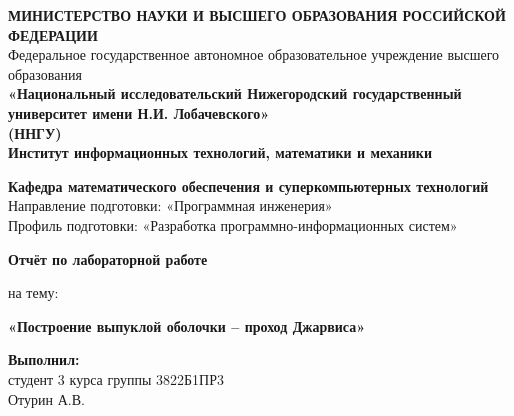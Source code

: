 \documentclass[12pt,a4paper]{extarticle}
\begin{document}
  
  \begin{titlepage}
    \begin{center}
      
      \onehalfspacing
      
      \begin{center}
        \textbf{МИНИСТЕРСТВО НАУКИ И ВЫСШЕГО ОБРАЗОВАНИЯ РОССИЙСКОЙ ФЕДЕРАЦИИ} \\          
        \vspace{0.5cm}
        Федеральное государственное автономное образовательное учреждение высшего образования \\ 
        \vspace{0.5cm}
        \textbf{«Национальный исследовательский Нижегородский государственный университет имени Н.И. Лобачевского»} \\
                \textbf{(ННГУ)} \\
        \vspace{0.5cm}
        \textbf{Институт информационных технологий, математики и механики} \\
        \vspace{0.5cm}
        
        \textbf{Кафедра математического обеспечения и суперкомпьютерных технологий} \\
        \vspace{0.5cm}
        Направление подготовки: «Программная инженерия» \\
        Профиль подготовки: «Разработка программно-информационных систем» \\

      \end{center}
      \vspace{0.5cm}
      \begin{center}
      
      \end{center}
      \vspace{2.5cm}
      \begin{center}
        \textbf{Отчёт по лабораторной работе}

        на тему: 
        
        \textbf{«Построение выпуклой оболочки – проход Джарвиса»}
      \end{center}
      
      \vspace{2.5cm}
      
      \begin{flushright}
        \textbf{Выполнил:} \\
        студент 3 курса группы 3822Б1ПР3 \\
                Отурин А.В. \\
        

\end{flushright}
\end{center}
\end{titlepage}
\end{document}

